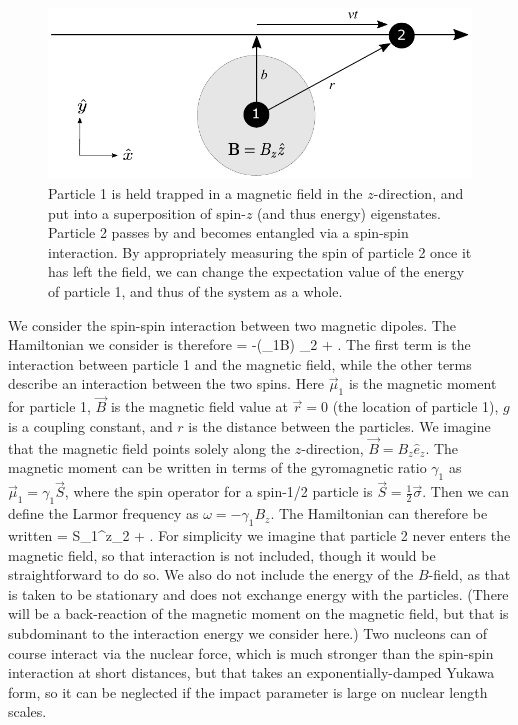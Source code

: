 \documentclass[aps,prd,onecolumn,nofootinbib,notitlepage]{revtex4-1}
\begin{document}
\begin{figure}[h]
\centering
\includegraphics[width=.6\textwidth]{experiment4.pdf}
\caption{Particle 1 is held trapped in a magnetic field in the $z$-direction, and put into a superposition of spin-$z$ (and thus energy) eigenstates.
Particle 2 passes by and becomes entangled via a spin-spin interaction. By appropriately measuring the spin of particle 2 once it has left the field, we can change the expectation value of the energy of particle 1, and thus of the system as a whole.}
\label{fig:experiment}
\end{figure}

We consider the spin-spin interaction between two magnetic dipoles.
The Hamiltonian we consider is therefore
\be
  \ham =  -({\vec\mu_1}\cdot\vec B) \otimes {}_2
  + .
\ee
The first term is the interaction between particle 1 and the magnetic field, while the other terms describe an interaction between the two spins.
Here $\vec \mu_1$ is the magnetic moment for particle 1, $\vec B$ is the magnetic field value at $\vec r = 0$ (the location of particle 1),  $g$ is a coupling constant, and $r$ is the distance between the particles.
We imagine that the magnetic field points solely along the $z$-direction, $\vec B = B_z\hat{e}_z$.
The magnetic moment can be written in terms of the gyromagnetic ratio $\gamma_1$ as $\vec\mu_1 = \gamma_1\vec{S}$, where the spin operator for a spin-1/2 particle is $\vec{S} = \frac{1}{2}\vec\sigma$.
Then we can define the Larmor frequency as $\omega = -\gamma_1 B_z$.
The Hamiltonian can therefore be written
\be
  \ham =  \omega S_1^z\otimes{}_2 
  + .
  \label{hamiltonian}
\ee
For simplicity we imagine that particle 2 never enters the magnetic field, so that interaction is not included, though it would be straightforward to do so.
We also do not include the energy of the $B$-field, as that is taken to be stationary and does not exchange energy with the particles.
(There will be a back-reaction of the magnetic moment on the magnetic field, but that is subdominant to the interaction energy we consider here.)
Two nucleons can of course interact via the nuclear force, which is much stronger than the spin-spin interaction at short distances, but that takes an exponentially-damped Yukawa form, so it can be neglected if the impact parameter is large on nuclear length scales.
\end{document}
